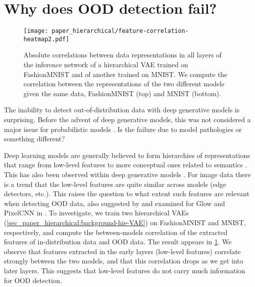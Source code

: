 {\section{Why does OOD detection fail?}\label{sec_paper_hierarchical:why-does-ood-fail}
\begin{figure}
    \centering
    \texttt{[image: paper\_hierarchical/feature-correlation-heatmap2.pdf]}
    \vspace{0mm}
    \caption[Absolute correlations between data representations in all layers of the inference network of a hierarchical VAE trained on FashionMNIST and of another trained on MNIST.]{
    Absolute correlations between data representations in all layers of the inference network of a hierarchical VAE trained on FashionMNIST and of another trained on MNIST.
    We compute the correlation between the representations of the two different models given the same data, FashionMNIST (top) and MNIST (bottom).
    }
    \vspace{0mm}
    \label{fig_hierarchical:correlations-heatmap}
\end{figure}

The inability to detect out-of-distribution data with deep generative models is surprising.
Before the advent of deep generative models, this was not considered a major issue for probabilistic models \parencite{bishop_novelty_1994}.
Is the failure due to model pathologies or something different?

Deep learning models are generally believed to form hierarchies of representations that range from low-level features to more conceptual ones related to semantics \parencite{bengio_representation_2013}.
This has also been observed within deep generative models \parencite{maaloe_biva_2019, child_very_2021}.
For image data there is a trend that the low-level features are quite similar across models (edge detectors, etc.). This raises the question to what extent such features are relevant when detecting OOD data, also suggested  by \parencite{nalisnick_deep_2019} and examined for Glow and PixelCNN in \parencite{schirrmeister_understanding_2020}.
To investigate, we train two hierarchical VAEs (\cref{sec_paper_hierarchical:background-hie-VAE}) on FashionMNIST and MNIST, respectively, and compute the between-models correlation of the extracted features of in-distribution data and OOD data.
The result appears in \cref{fig_hierarchical:correlations-heatmap}.
We observe that features extracted in the early layers (low-level features) correlate strongly between the two models, and that this correlation drops as we get into later layers.
This suggests that low-level features do not carry much information for OOD detection.

}
